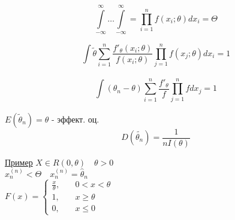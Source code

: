 \documentclass[a4paper]{article}
\begin{document}
\[
    \int\limits_{-\infty}^{\infty} \dots \int\limits_{-\infty}^{\infty} 
    = \prod\limits_{i=1}^{n} f(x_i;\theta)dx_i = \Theta
\]

\[
    \int\limits_{}^{} \tilde{\theta} \sum\limits_{i=1}^{n}  
    \frac{f'_\theta(x_i;\theta)}{f(x_i;\theta)} \prod\limits_{j=1}^{n} 
    f(x_j;\theta)dx_i = 1
\]

\[
    \int\limits_{}^{} (\theta_n - \theta) \sum\limits_{i=1}^{n} 
    \frac{f'_\theta}{f} \prod\limits_{j=1}^{n} fdx_j = 1 
\] 


$ E(\tilde{\theta}_n) = \theta $ - эффект. оц. 
\[
    D(\tilde{\theta_n}) = \frac{1}{nI(\theta)} 
\]

\underline{Пример} $ X \in R(0, \theta) \quad \theta > 0 $\\
$ x_n^{(n)} < \Theta \quad x_n^{(n)} = \hat{\theta}_n $ \\
$ F(x) = \begin{cases}
    \frac{x}{\theta}, &\quad 0<x<\theta\\
    1, &\quad x\geq \theta\\
    0, &\quad x\leq 0
\end{cases}    
$ 
\end{document}
